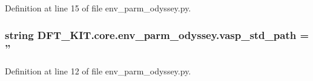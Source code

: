 Definition at line 15 of file env\+\_\+parm\+\_\+odyssey.\+py.

\hypertarget{namespace_d_f_t___k_i_t_1_1core_1_1env__parm__odyssey_a70c21898b165cb1b987c3d04aa51ede1}{
\subsubsection[{vasp\+\_\+std\+\_\+path}]{\setlength{\rightskip}{0pt plus 5cm}string D\+F\+T\+\_\+\+K\+I\+T.\+core.\+env\+\_\+parm\+\_\+odyssey.\+vasp\+\_\+std\+\_\+path = ''}}\label{namespace_d_f_t___k_i_t_1_1core_1_1env__parm__odyssey_a70c21898b165cb1b987c3d04aa51ede1}


Definition at line 12 of file env\+\_\+parm\+\_\+odyssey.\+py.

